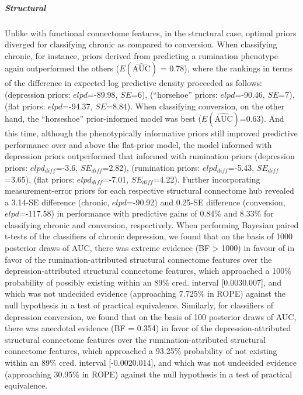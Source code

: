 \documentclass[
  notitlepage]{article}
\begin{document}
\hypertarget{structural-1}{%
\subparagraph{Structural}\label{structural-1}}
Unlike with functional connectome features, in the structural case,
optimal priors diverged for classifying chronic as compared to
conversion. When classifying chronic, for instance, priors derived from
predicting a rumination phenotype again outperformed the others
(\(\mathrm{\textit{E}}(\mathrm{\hat{\text{AUC}}})\) = 0.78), where the
rankings in terms of the difference in expected log predictive density
proceeded as follows: (depression priors: \(elpd\)=-89.98, \(SE\)=6),
(``horsehoe'' priors: \(elpd\)=-90.46, \(SE\)=7), (flat priors:
\(elpd\)=-94.37, \(SE\)=8.84). When classifying conversion, on the other
hand, the ``horseshoe'' prior-informed model was best
(\(\mathrm{\textit{E}}(\mathrm{\hat{\text{AUC}}})\)=0.63). And this
time, although the phenotypically informative priors still improved
predictive performance over and above the flat-prior model, the model
informed with depression priors outperformed that informed with
rumination priors (depression priors: \(elpd_{diff}\)=-3.6,
\(SE_{diff}\)=2.82), (rumination priors: \(elpd_{diff}\)=-5.43,
\(SE_{diff}\)=3.65), (flat priors: \(elpd_{diff}\)=-7.01,
\(SE_{diff}\)=4.22). Further incorporating measurement-error priors for
each respective structural connectome hub revealed a 3.14-SE difference
(chronic, \(elpd\)=-90.92) and 0.25-SE difference (conversion,
\(elpd\)=-117.58) in performance with predictive gains of 0.84\% and
8.33\% for classifying chronic and conversion, respectively. When
performing Bayesian paired t-tests of the classifiers of chronic
depression, we found that on the basis of 1000 posterior draws of AUC,
there was extreme evidence (BF \textgreater{} 1000) in favour of in
favor of the rumination-attributed structural connectome features over
the depression-attributed structural connectome features, which
approached a 100\% probability of possibly existing within an 89\% cred.
interval {[}0.0030.007{]}, and which was not undecided evidence
(approaching 7.725\% in ROPE) against the null hypothesis in a test of
practical equivalence. Similarly, for classifiers of depression
conversion, we found that on the basis of 100 posterior draws of AUC,
there was anecdotal evidence (BF = 0.354) in favor of the
depression-attributed structural connectome features over the
rumination-attributed structural connectome features, which approached a
93.25\% probability of not existing within an 89\% cred. interval
{[}-0.0020.014{]}, and which was not undecided evidence (approaching
30.95\% in ROPE) against the null hypothesis in a test of practical
equivalence.
\end{document}

